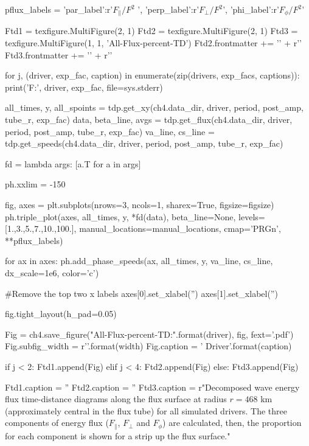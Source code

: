 \begin{pycode}[chapter4]
pflux_labels = {'par_label':r'$F_\parallel / F^2$ ',
                'perp_label':r'$F_\perp / F^2$',
                'phi_label':r'$F_\phi / F^2$'}

Ftd1 = texfigure.MultiFigure(2, 1)
Ftd2 = texfigure.MultiFigure(2, 1)
Ftd3 = texfigure.MultiFigure(1, 1, 'All-Flux-percent-TD')
Ftd2.frontmatter += '\n' + r'\ContinuedFloat'
Ftd3.frontmatter += '\n' + r'\ContinuedFloat'

for j, (driver, exp_fac, caption) in enumerate(zip(drivers, exp_facs, captions)):
    print('F:', driver, exp_fac, file=sys.stderr)


    all_times, y, all_spoints = tdp.get_xy(ch4.data_dir, driver, period, post_amp, tube_r, exp_fac)
    data, beta_line, avgs = tdp.get_flux(ch4.data_dir, driver, period, post_amp, tube_r, exp_fac)
    va_line, cs_line = tdp.get_speeds(ch4.data_dir, driver, period, post_amp, tube_r, exp_fac)


    fd = lambda args: [a.T for a in args]

    ph.xxlim = -150

    fig, axes = plt.subplots(nrows=3, ncols=1, sharex=True, figsize=figsize)
    ph.triple_plot(axes, all_times, y, *fd(data), beta_line=None,
    levels=[1.,3.,5.,7.,10.,100.], manual_locations=manual_locations, cmap='PRGn', **pflux_labels)

    for ax in axes:
        ph.add_phase_speeds(ax, all_times, y, va_line, cs_line, dx_scale=1e6, color='c')

    #Remove the top two x labels
    axes[0].set_xlabel('')
    axes[1].set_xlabel('')

    fig.tight_layout(h_pad=0.05)

    Fig = ch4.save_figure("All-Flux-percent-TD:{}".format(driver), fig, fext='.pdf')
    Fig.subfig_width = r'{}\columnwidth'.format(width)
    Fig.caption = '{} Driver'.format(caption)

    if j < 2:
        Ftd1.append(Fig)
    elif j < 4:
        Ftd2.append(Fig)
    else:
        Ftd3.append(Fig)


Ftd1.caption = ''
Ftd2.caption = ''
Ftd3.caption = r"Decomposed wave energy flux time-distance diagrams along the flux surface at radius $r = 468$ km (approximately central in the flux tube) for all simulated drivers. The three components of energy flux ($F_\parallel$, $F_\perp$ and $F_\phi$) are calculated, then, the proportion for each component is shown for a strip up the flux surface."
\end{pycode}


